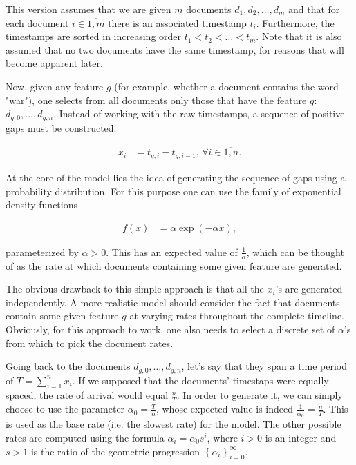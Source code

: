This version assumes that we are given $m$ documents $d_1, d_2, \ldots, d_m$ and that for each document $i \in \overline{1,m}$ there is an associated timestamp $t_i$. Furthermore, the timestamps are sorted in increasing order $t_1 < t_2 < \ldots < t_m$. Note that it is also assumed that no two documents have the same timestamp, for reasons that will become apparent later.

Now, given any feature $g$ (for example, whether a document contains the word "war"), one selects from all documents only those that have the feature $g$: $d_{g,0}, \ldots, d_{g,n}$. Instead of working with the raw timestamps, a sequence of positive gaps must be constructed:

\begin{align}
\label{eq:positive-gaps}
x_i &= t_{g,i} - t_{g,i - 1}, \, \forall i \in \overline{1,n}.
\end{align}

At the core of the model lies the idea of generating the sequence of gaps using a probability distribution. For this purpose one can use the family of exponential density functions

\begin{align}
\label{eq:exponential-density}
f(x) &= \alpha \exp \left( -\alpha x \right),
\end{align}

parameterized by $\alpha > 0$. This has an expected value of $\frac1{\alpha}$, which can be thought of as the rate at which documents containing some given feature are generated.

The obvious drawback to this simple approach is that all the $x_i$'s are generated independently. A more realistic model should consider the fact that documents contain some given feature $g$ at varying rates throughout the complete timeline. Obviously, for this approach to work, one also needs to select a discrete set of $\alpha$'s from which to pick the document rates.

Going back to the documents $d_{g,0}, \ldots, d_{g,n}$, let's say that they span a time period of $\displaystyle T = \sum_{i=1}^{n} x_i$. If we supposed that the documents' timestaps were equally-spaced, the rate of arrival would equal $\frac{n}{T}$. In order to generate it, we can simply choose to use the parameter $\alpha_0 = \frac{T}{n}$, whose expected value is indeed $\frac{1}{\alpha_0} = \frac{n}{T}$. This is used as the base rate (i.e. the slowest rate) for the model. The other possible rates are computed using the formula $\alpha_i = \alpha_0 s^i$, where $i > 0$ is an integer and $s > 1$ is the ratio of the geometric progression $\left\{ \alpha_i \right\}_{i=0}^{\infty}$.

